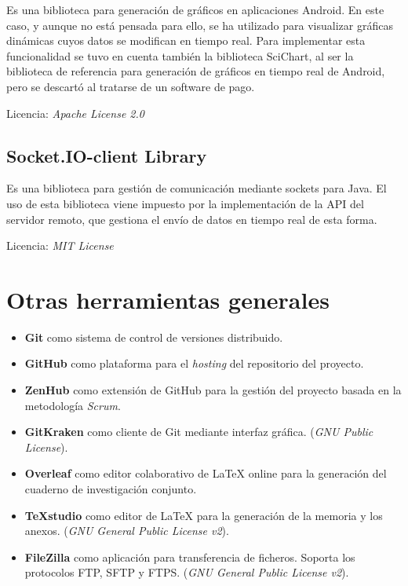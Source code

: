 Es una biblioteca para generación de gráficos en aplicaciones Android. En este caso, y aunque no está pensada para ello, se ha utilizado para visualizar gráficas dinámicas cuyos datos se modifican en tiempo real. Para implementar esta funcionalidad se tuvo en cuenta también la biblioteca SciChart, al ser la biblioteca de referencia para generación de gráficos en tiempo real de Android, pero se descartó al tratarse de un software de pago. 

Licencia: \textit{Apache License 2.0}

\subsection{Socket.IO-client Library}

Es una biblioteca para gestión de comunicación mediante sockets para Java. El uso de esta biblioteca viene impuesto por la implementación de la API del servidor remoto, que gestiona el envío de datos en tiempo real de esta forma. 

Licencia: \textit{MIT License}

\section{Otras herramientas generales}

\begin{itemize}
	\item \textbf{Git} como sistema de control de versiones distribuido. 
	\item \textbf{GitHub} como plataforma para el \textit{hosting} del repositorio del proyecto. 
	\item \textbf{ZenHub} como extensión de GitHub para la gestión del proyecto basada en la metodología \textit{Scrum}. 
	\item \textbf{GitKraken} como cliente de Git mediante interfaz gráfica. (\textit{GNU Public License}).
	\item \textbf{Overleaf} como editor colaborativo de \LaTeX{} online para la generación del cuaderno de investigación conjunto. 
	\item \textbf{\TeX studio} como editor de \LaTeX{} para la generación de la memoria y los anexos. (\textit{GNU General Public License v2}).
	\item \textbf{FileZilla} como aplicación para transferencia de ficheros. Soporta los protocolos FTP, SFTP y FTPS. (\textit{GNU General Public License v2}).
\end{itemize}




















